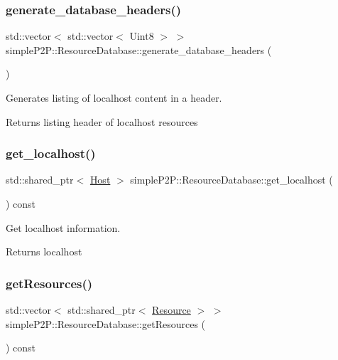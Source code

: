 \subsubsection{\texorpdfstring{generate\+\_\+database\+\_\+headers()}{generate\_database\_headers()}}
{\footnotesize\ttfamily std\+::vector$<$ std\+::vector$<$ Uint8 $>$ $>$ simple\+P2\+P\+::\+Resource\+Database\+::generate\+\_\+database\+\_\+headers (\begin{DoxyParamCaption}{ }\end{DoxyParamCaption})}



Generates listing of localhost content in a header. 

\begin{DoxyReturn}{Returns}
listing header of localhost resources 
\end{DoxyReturn}
\mbox{\label{classsimpleP2P_1_1ResourceDatabase_a4d8c618cbb707f9b29f6315ff1abe6f6}} 
\subsubsection{\texorpdfstring{get\+\_\+localhost()}{get\_localhost()}}
{\footnotesize\ttfamily std\+::shared\+\_\+ptr$<$ \hyperlink{classsimpleP2P_1_1Host}{Host} $>$ simple\+P2\+P\+::\+Resource\+Database\+::get\+\_\+localhost (\begin{DoxyParamCaption}{ }\end{DoxyParamCaption}) const}



Get localhost information. 

\begin{DoxyReturn}{Returns}
localhost 
\end{DoxyReturn}
\mbox{\label{classsimpleP2P_1_1ResourceDatabase_a85e304c650a0a3d5cd2395587befceeb}} 
\subsubsection{\texorpdfstring{get\+Resources()}{getResources()}}
{\footnotesize\ttfamily std\+::vector$<$ std\+::shared\+\_\+ptr$<$ \hyperlink{classsimpleP2P_1_1Resource}{Resource} $>$ $>$ simple\+P2\+P\+::\+Resource\+Database\+::get\+Resources (\begin{DoxyParamCaption}{ }\end{DoxyParamCaption}) const}



